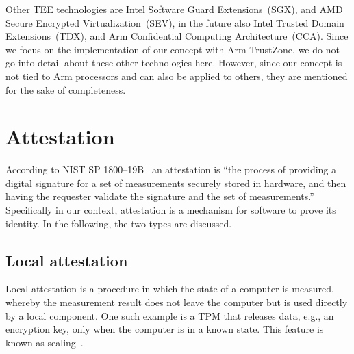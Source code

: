 Other \ac{TEE} technologies are Intel Software Guard Extensions~(SGX), and AMD Secure Encrypted Virtualization~(SEV), in the future also Intel Trusted Domain Extensions~(TDX), and Arm Confidential Computing Architecture~(CCA). Since we focus on the implementation of our concept with Arm TrustZone, we do not go into detail about these other technologies here. However, since our concept is not tied to Arm processors and can also be applied to others, they are mentioned for the sake of completeness.





\section{Attestation}


According to NIST SP 1800--19B~\cite{Bartock2022} an attestation is ``the process of providing a digital signature for a set of measurements securely stored in hardware, and then having the requester validate the signature and the set of measurements.''
Specifically in our context, attestation is a mechanism for software to prove its identity.
In the following, the two types are discussed.


\subsection{Local attestation}

Local attestation is a procedure in which the state of a computer is measured, whereby the measurement result does not leave the computer but is used directly by a local component. One such example is a \ac{TPM} that releases data, e.g., an encryption key, only when the computer is in a known state. This feature is known as sealing~\cite{tpm}.


